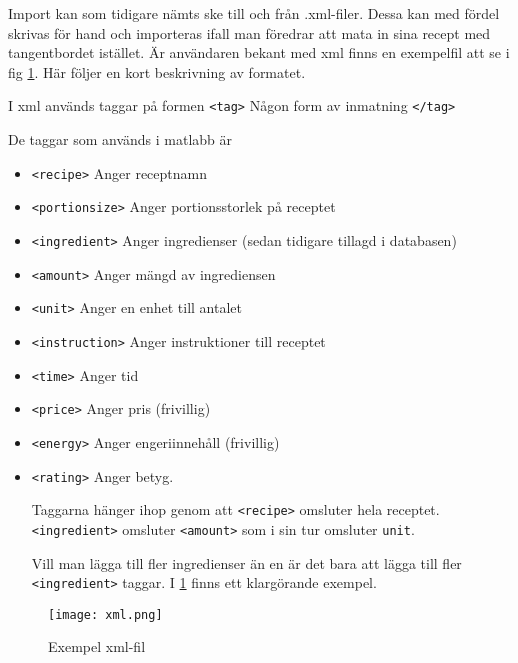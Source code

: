 Import kan som tidigare nämts ske till och från .xml-filer. Dessa kan
med fördel skrivas för hand och importeras ifall man föredrar att mata
in sina recept med tangentbordet istället. Är användaren bekant med
xml finns en exempelfil att se i fig \ref{fig:xml}. Här följer en kort
beskrivning av formatet.

I xml används taggar på formen \verb+<tag>+ Någon form av inmatning \verb+</tag>+

De taggar som används i matlabb är
\begin{itemize}
\item \verb+<recipe>+ Anger receptnamn
\item \verb+<portionsize>+ Anger portionsstorlek på receptet
\item \verb+<ingredient>+ Anger ingredienser (sedan tidigare tillagd i
  databasen)
\item \verb+<amount>+ Anger mängd av ingrediensen
\item \verb+<unit>+ Anger en enhet till antalet
\item \verb+<instruction>+ Anger instruktioner till receptet
\item \verb+<time>+ Anger tid
\item \verb+<price>+ Anger pris (frivillig)
\item \verb+<energy>+ Anger engeriinnehåll (frivillig)
\item \verb+<rating>+ Anger betyg.

Taggarna hänger ihop genom att \verb+<recipe>+ omsluter hela
receptet. \verb+<ingredient>+ omsluter \verb+<amount>+ som i sin tur
omsluter \verb+unit+.

Vill man lägga till fler ingredienser än en är det bara att lägga till
fler \verb+<ingredient>+ taggar. I \ref{fig:xml} finns ett klargörande exempel.
 
\end{itemize}



\begin{figure}[H]
         
        \texttt{[image: xml.png]} 
        \caption{Exempel xml-fil} 
        \label{fig:xml}
\end{figure} 
